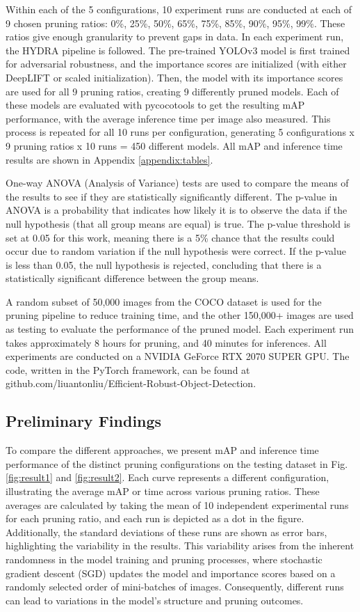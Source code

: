 \documentclass[journal,onecolumn,12pt]{IEEEtran}
\begin{document}
Within each of the 5 configurations, 10 experiment runs are conducted at each of 9 chosen pruning ratios: 0\%, 25\%, 50\%, 65\%, 75\%, 85\%, 90\%, 95\%, 99\%. These ratios give enough granularity to prevent gaps in data. In each experiment run, the HYDRA pipeline is followed. The pre-trained YOLOv3 model is first trained for adversarial robustness, and the importance scores are initialized (with either DeepLIFT or scaled initialization). Then, the model with its importance scores are used for all 9 pruning ratios, creating 9 differently pruned models. Each of these models are evaluated with pycocotools to get the resulting mAP performance, with the average inference time per image also measured. This process is repeated for all 10 runs per configuration, generating 5 configurations x 9 pruning ratios x 10 runs = 450 different models. All mAP and inference time results are shown in Appendix \ref{appendix:tables}.

One-way ANOVA (Analysis of Variance) tests are used to compare the means of the results to see if they are statistically significantly different. The p-value in ANOVA is a probability that indicates how likely it is to observe the data if the null hypothesis (that all group means are equal) is true. The p-value threshold is set at 0.05 for this work, meaning there is a 5\% chance that the results could occur due to random variation if the null hypothesis were correct. If the p-value is less than 0.05, the null hypothesis is rejected, concluding that there is a statistically significant difference between the group means.

A random subset of 50,000 images from the COCO dataset is used for the pruning pipeline to reduce training time, and the other 150,000+ images are used as testing to evaluate the performance of the pruned model. Each experiment run takes approximately 8 hours for pruning, and 40 minutes for inferences. All experiments are conducted on a NVIDIA GeForce RTX 2070 SUPER GPU. The code, written in the PyTorch framework, can be found at github.com/liuantonliu/Efficient-Robust-Object-Detection.

\subsection{Preliminary Findings}
To compare the different approaches, we present mAP and inference time performance of the distinct pruning configurations on the testing dataset in Fig. \ref{fig:result1} and \ref{fig:result2}. Each curve represents a different configuration, illustrating the average mAP or time across various pruning ratios. These averages are calculated by taking the mean of 10 independent experimental runs for each pruning ratio, and each run is depicted as a dot in the figure. Additionally, the standard deviations of these runs are shown as error bars, highlighting the variability in the results. This variability arises from the inherent randomness in the model training and pruning processes, where stochastic gradient descent (SGD) updates the model and importance scores based on a randomly selected order of mini-batches of images. Consequently, different runs can lead to variations in the model's structure and pruning outcomes. 
\end{document}
